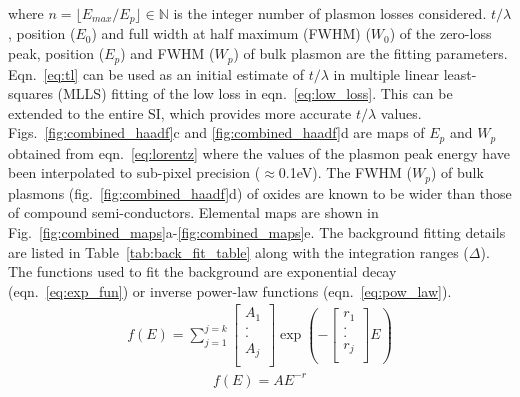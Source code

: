 \documentclass[%
aip,
rsi,%
 amsmath,amssymb,%
 reprint,%
]{revtex4-1}
\begin{document}
where $n = \lfloor E_{max}/E_p \rfloor \in \mathbb{N}$ is the integer number of plasmon losses considered. $t/\lambda$, position ($E_0$) and full width at half maximum (FWHM) ($W_0$) of the zero-loss peak, position ($E_p$) and FWHM ($W_p$) of bulk plasmon are the fitting parameters. Eqn.~\ref{eq:tl} can be used as an initial estimate of $t/\lambda$ in multiple linear least-squares (MLLS) fitting of the low loss in eqn.~\ref{eq:low_loss}. This can be extended to the entire SI, which provides more accurate $t/\lambda$ values. Figs.~\ref{fig:combined_haadf}c and \ref{fig:combined_haadf}d are maps of $E_p$ and $W_p$ obtained from eqn.~\ref{eq:lorentz} where the values of the plasmon peak energy have been interpolated to sub-pixel precision ($\approx$0.1eV). The FWHM  ($W_p$) of bulk plasmons (fig.~\ref{fig:combined_haadf}d) of oxides are known to be wider than those of compound semi-conductors. Elemental maps are shown in Fig.~\ref{fig:combined_maps}a-\ref{fig:combined_maps}e. The background fitting details are listed in Table~\ref{tab:back_fit_table} along with the integration ranges ($\Delta$). The functions used to fit the background are exponential decay (eqn.~\ref{eq:exp_fun}) or inverse power-law functions (eqn.~\ref{eq:pow_law}).
\begin{eqnarray}
	f(E) =
    \sum^{j=k}_{j=1}
    \left[
    \begin{array}{c}
    	A_1 	\\
        . 		\\
        . 		\\
        A_j 	\\
    \end{array}
    \right]
    \operatorname{exp}\left(-\left[
    \begin{array}{c}
    	r_1 	\\
        . 		\\
        . 		\\
        r_j 	\\
    \end{array}
    \right]E\right)
    \label{eq:exp_fun}
\end{eqnarray}
\begin{eqnarray}
	f(E) = AE^{-r}
    \label{eq:pow_law}
\end{eqnarray}
\end{document}

